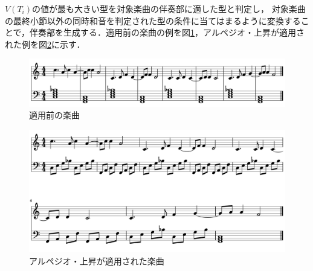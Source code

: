 $V(T_i)$の値が最も大きい型を対象楽曲の伴奏部に適した型と判定し，
対象楽曲の最終小節以外の同時和音を判定された型の条件に当てはまるように変換することで，伴奏部を生成する．適用前の楽曲の例を図\ref{fig:before}，アルペジオ・上昇が適用された例を図\ref{fig:after}に示す．

\begin{figure}[htb]
  \centering
  \includegraphics[scale=0.4]{image/before.png}
  \caption{適用前の楽曲}
  \label{fig:before}
\end{figure}

\begin{figure}[htb]
  \centering
  \includegraphics[scale=0.4]{image/after.png}
  \caption{アルペジオ・上昇が適用された楽曲}
  \label{fig:after}
\end{figure}